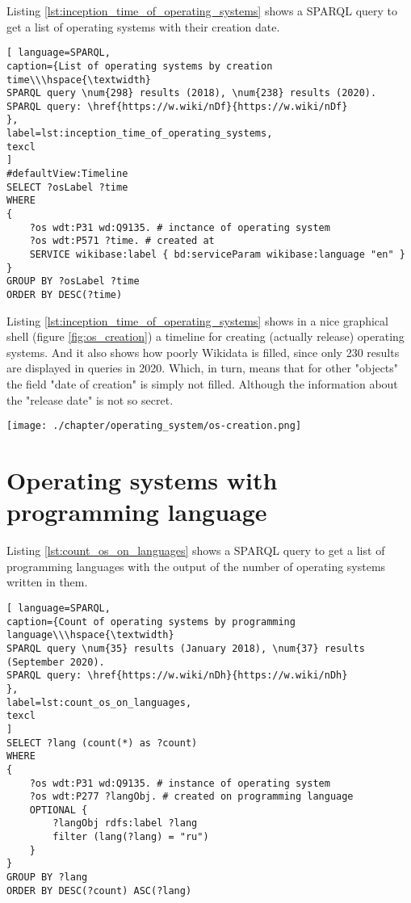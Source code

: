 Listing \ref{lst:inception_time_of_operating_systems} shows a SPARQL query to get a list of operating systems with their creation date.

\begin{lstlisting}[ language=SPARQL, 
caption={List of operating systems by creation time\\\hspace{\textwidth}
SPARQL query \num{298} results (2018), \num{238} results (2020).
SPARQL query: \href{https://w.wiki/nDf}{https://w.wiki/nDf}
},
label=lst:inception_time_of_operating_systems,
texcl 
]
#defaultView:Timeline
SELECT ?osLabel ?time
WHERE
{
	?os wdt:P31 wd:Q9135. # inctance of operating system
	?os wdt:P571 ?time. # created at
	SERVICE wikibase:label { bd:serviceParam wikibase:language "en" }
}
GROUP BY ?osLabel ?time
ORDER BY DESC(?time)
\end{lstlisting}

Listing \ref{lst:inception_time_of_operating_systems} shows in a nice graphical shell (figure \ref{fig:os_creation}) a timeline for creating (actually release) operating systems. And it also shows how poorly Wikidata is filled, since only 230 results are displayed in queries in 2020. Which, in turn, means that for other "objects" the field "date of creation" is simply not filled. Although the information about the "release date" is not so secret.

\begin{figure*}[h!]
	\texttt{[image: ./chapter/operating\_system/os-creation.png]}
	\caption{Part of the operating system release timeline for 2020 year.}
	\label{fig:os_creation}
\end{figure*}

\section{Operating systems with programming language}

Listing \ref{lst:count_os_on_languages} shows a SPARQL query to get a list of programming languages with the output of the number of operating systems written in them.

\begin{lstlisting}[ language=SPARQL, 
caption={Count of operating systems by programming language\\\hspace{\textwidth}
SPARQL query \num{35} results (January 2018), \num{37} results (September 2020).
SPARQL query: \href{https://w.wiki/nDh}{https://w.wiki/nDh}
},
label=lst:count_os_on_languages,
texcl 
]
SELECT ?lang (count(*) as ?count)
WHERE 
{
	?os wdt:P31 wd:Q9135. # instance of operating system
	?os wdt:P277 ?langObj. # created on programming language
	OPTIONAL {
		?langObj rdfs:label ?lang
		filter (lang(?lang) = "ru")
	}
}
GROUP BY ?lang
ORDER BY DESC(?count) ASC(?lang)
\end{lstlisting}


